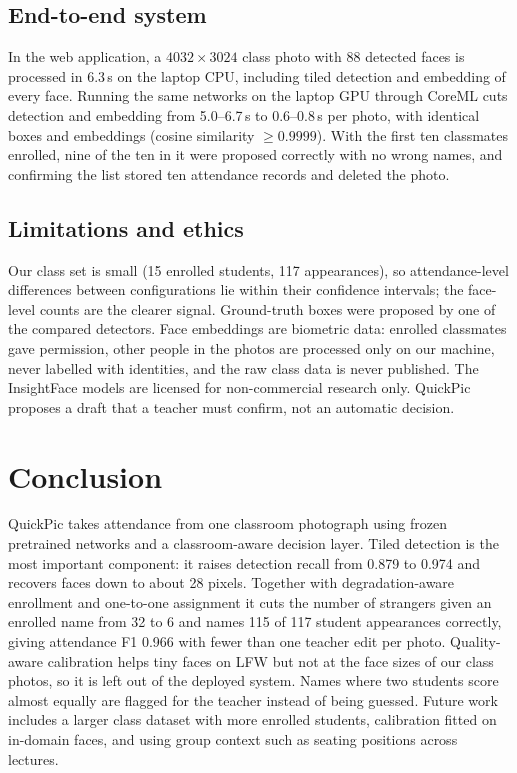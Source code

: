 \documentclass[conference,a4paper]{IEEEtran}
\begin{document}
\subsection{End-to-end system}
In the web application, a $4032\times3024$ class photo with 88 detected faces is processed in 6.3\,s on the laptop CPU, including tiled detection and embedding of every face. Running the same networks on the laptop GPU through CoreML cuts detection and embedding from 5.0--6.7\,s to 0.6--0.8\,s per photo, with identical boxes and embeddings (cosine similarity $\ge 0.9999$). With the first ten classmates enrolled, nine of the ten in it were proposed correctly with no wrong names, and confirming the list stored ten attendance records and deleted the photo.

\subsection{Limitations and ethics}
Our class set is small (15 enrolled students, 117 appearances), so attendance-level differences between configurations lie within their confidence intervals; the face-level counts are the clearer signal. Ground-truth boxes were proposed by one of the compared detectors. Face embeddings are biometric data: enrolled classmates gave permission, other people in the photos are processed only on our machine, never labelled with identities, and the raw class data is never published. The InsightFace models are licensed for non-commercial research only. QuickPic proposes a draft that a teacher must confirm, not an automatic decision.

\section{Conclusion}

QuickPic takes attendance from one classroom photograph using frozen pretrained networks and a classroom-aware decision layer. Tiled detection is the most important component: it raises detection recall from 0.879 to 0.974 and recovers faces down to about 28 pixels. Together with degradation-aware enrollment and one-to-one assignment it cuts the number of strangers given an enrolled name from 32 to 6 and names 115 of 117 student appearances correctly, giving attendance F1 0.966 with fewer than one teacher edit per photo. Quality-aware calibration helps tiny faces on LFW but not at the face sizes of our class photos, so it is left out of the deployed system. Names where two students score almost equally are flagged for the teacher instead of being guessed. Future work includes a larger class dataset with more enrolled students, calibration fitted on in-domain faces, and using group context such as seating positions across lectures.
\end{document}
